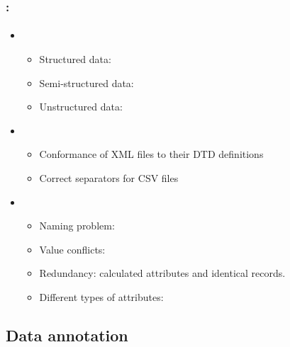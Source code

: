 \documentclass[xcolor=table]{beamer}
\begin{document}
\begin{frame}
	\frametitle{\insertshortsubtitle: \insertsection}
	\framesubtitle{\insertsubsection}
	
	\begin{itemize}
		\item {}
		\begin{itemize}
			\item Structured data: 
			\item Semi-structured data: 
			\item Unstructured data: 
		\end{itemize}
	
		\item {}
		\begin{itemize}
			\item Conformance of XML files to their DTD definitions
			\item Correct separators for CSV files
		\end{itemize}
	
		\item {}
		\begin{itemize}
			\item Naming problem: 
			\item Value conflicts: 
			\item Redundancy: calculated attributes and identical records.
			\item Different types of attributes: 
		\end{itemize}
	\end{itemize}

\end{frame}


\subsection{Data annotation}
\end{document}
